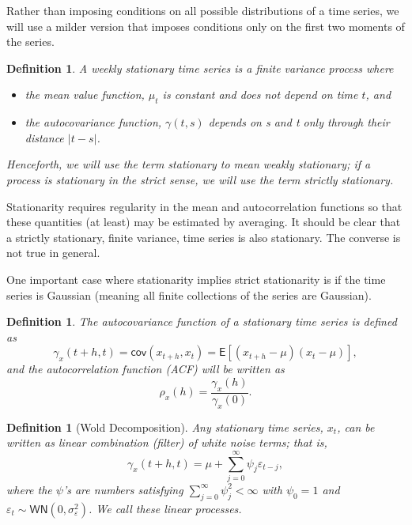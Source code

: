 \documentclass[
paper=128mm:96mm, %
fontsize=9.5pt, %
pagesize, %
parskip=half-, %
]{scrartcl} %
\theoremstyle{mythmstyle} %
\newtheorem{definition}[theorem]{Definition} %
\begin{document}
Rather than imposing conditions on all possible distributions of a time series, we will use a milder version that imposes conditions only on the first two moments of the series.

\clearpage

\begin{definition}
A weekly stationary time series is a finite variance process where
\begin{itemize}
\item[{(i)}] the mean value function, $\mu_t$ is constant and does not depend on time $t$, and
\item[{(ii)}] the autocovariance function, $\gamma(t,s)$ depends on s and t only through their distance $\vert t-s\vert$.
%
\end{itemize}
%
Henceforth, we will use the term stationary to mean weakly stationary; if a process is stationary in the strict sense, we will use the term strictly stationary.
\end{definition}
%
Stationarity requires regularity in the mean and autocorrelation functions so that these quantities (at least) may be estimated by averaging. It should be clear that a strictly stationary, finite variance, time series is also stationary. The converse is not true in general. 

One important case where stationarity implies strict stationarity is if the time series is Gaussian (meaning all finite collections of the series are Gaussian).
\clearpage

\begin{definition}
The autocovariance function of a stationary time series is defined as
\begin{equation}
\label{eq:acov_stat_def}
\gamma_{x}\left(t+h,t\right)=\mathsf{cov}\left(x_{t+h},x_{t}\right)=\mathsf{E}\left[\left(x_{t+h}-\mu\right)\left(x_t-\mu\right)\right],
\end{equation}
%
and the autocorrelation function (ACF) 
will be written as
\begin{equation}
\label{eq:acf_def}
\rho_{x}\left(h\right)=\frac{\gamma_{x}\left(h\right)}{\gamma_{x}\left(0\right)}.
\end{equation}
%
\end{definition}



\clearpage


\begin{definition}[Wold Decomposition] Any stationary time series, $x_t$, can be written as linear combination (filter) of white noise terms; that is,
\begin{equation}
\label{eq:wold_stat_def}
\gamma_{x}\left(t+h,t\right)=\mu+\sum_{j=0}^\infty\psi_j\varepsilon_{t-j},
\end{equation}
where the $\psi$'s are numbers satisfying $\sum_{j=0}^\infty\psi_j^2<\infty$ with $\psi_0=1$ and $\varepsilon_{t}\sim\mathsf{WN}\left(0,\sigma^2_\varepsilon\right)$. We call these
linear processes.
\end{definition}
\clearpage
\end{document}
